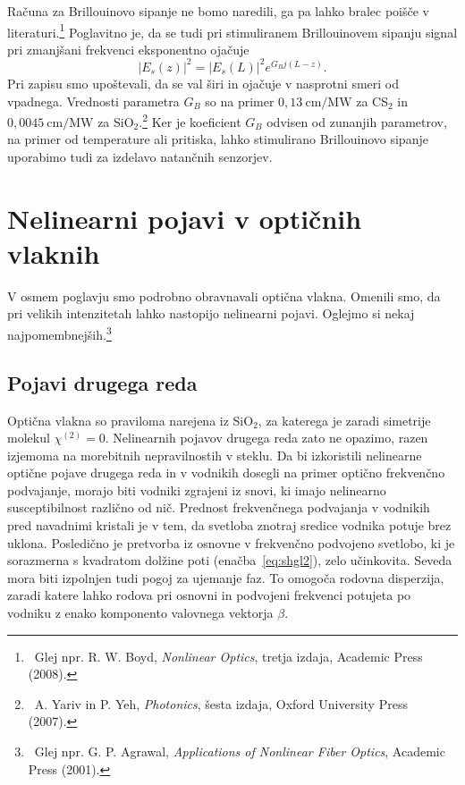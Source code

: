 Računa za Brillouinovo sipanje ne bomo naredili, ga pa lahko bralec poišče
v literaturi.\footnote{~Glej npr. R. W. Boyd, {\it Nonlinear Optics}, tretja izdaja, Academic Press (2008).}
Poglavitno 
je, da se tudi pri stimuliranem Brillouinovem sipanju signal pri zmanjšani frekvenci
eksponentno ojačuje
\begin{equation}
|E_s(z)|^2 = |E_s(L)|^2 e^{G_Bj(L-z)}.
\end{equation}
Pri zapisu smo upoštevali, da se val širi in ojačuje v nasprotni smeri od vpadnega.
Vrednosti parametra $G_B$ so na primer $0,13~\si{\cm/\mega\watt}$ za CS$_2$ 
in $0,0045~\si{\cm/\mega\watt}$ za SiO$_2$.\footnote{~A. Yariv in 
P. Yeh, {\it Photonics}, šesta izdaja, Oxford University Press (2007).}
Ker je koeficient $G_B$ odvisen od zunanjih parametrov, na primer od 
temperature ali pritiska, lahko stimulirano Brillouinovo sipanje uporabimo tudi za
izdelavo natančnih senzorjev. 

\section{Nelinearni pojavi v optičnih vlaknih}
\label{NLOFIB}
V osmem poglavju smo podrobno obravnavali optična vlakna. Omenili smo, da pri 
velikih intenzitetah lahko nastopijo nelinearni pojavi. Oglejmo si nekaj najpomembnejših.\footnote{~Glej npr.
G. P. Agrawal, {\it Applications of Nonlinear Fiber Optics}, Academic Press (2001).}

\subsection*{Pojavi drugega reda}
Optična vlakna so praviloma narejena iz SiO$_2$, 
za katerega je zaradi simetrije molekul $\chi^{(2)}=0$. 
Nelinearnih pojavov drugega reda zato ne opazimo, razen izjemoma na morebitnih 
nepravilnostih v steklu.
Da bi izkoristili nelinearne optične pojave
drugega reda in v vodnikih dosegli na primer optično frekvenčno podvajanje,
morajo biti vodniki zgrajeni iz snovi, ki imajo nelinearno susceptibilnost 
različno od nič. Prednost frekvenčnega podvajanja v vodnikih pred navadnimi 
kristali je v tem, 
da svetloba znotraj sredice vodnika potuje brez uklona. Posledično je
pretvorba iz osnovne v frekvenčno podvojeno svetlobo, ki je sorazmerna s kvadratom 
dolžine poti (enačba~\ref{eq:shgl2}), zelo učinkovita. Seveda 
mora biti izpolnjen tudi pogoj za ujemanje faz. To 
omogoča rodovna disperzija, zaradi 
katere lahko rodova pri osnovni in podvojeni frekvenci potujeta po vodniku
z enako komponento valovnega vektorja $\beta$.

